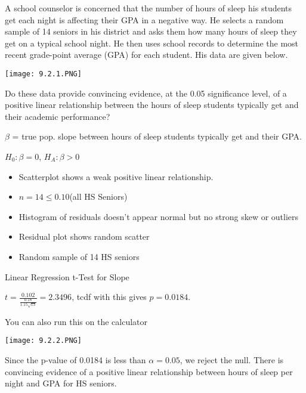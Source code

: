 \documentclass[../stats.tex]{subfiles}
\begin{document}
\begin{example}
    A school counselor is concerned that the number of hours of sleep his students get each night is affecting their GPA in a negative way. He selects a random sample of 14 seniors in his district and asks them how many hours of sleep they get on a typical school night. 
    He then uses school records to determine the most recent grade-point average (GPA) for each student. His data are given below.

    \begin{center}
        \texttt{[image: 9.2.1.PNG]}
    \end{center}

    Do these data provide convincing evidence, at the 0.05 significance level, of a positive linear relationship between the hours of sleep students typically get and their academic performance?

    $\beta$ = true pop. slope between hours of sleep students typically get and their GPA.

    $H_0: \beta = 0$, $H_A: \beta >0$

    \begin{itemize}
        \item Scatterplot shows a weak positive linear relationship.
        \item $n=14\leq 0.10$(all HS Seniors)
        \item Histogram of residuals doesn't appear normal but no strong skew or outliers 
        \item Residual plot shows random scatter 
        \item Random sample of 14 HS seniors
    \end{itemize}

    Linear Regression t-Test for Slope 

    $t=\frac{0.102}{\frac{0.18}{1.15\sqrt{13}}}=2.3496$, tcdf with this gives $p=0.0184$.

    You can also run this on the calculator 
    \begin{center}
        \texttt{[image: 9.2.2.PNG]}
    \end{center}

    Since the p-value of 0.0184 is less than $\alpha = 0.05$, we reject the null. There is convincing evidence of a positive linear relationship between hours of sleep per night and GPA for HS seniors.
\end{example}
\end{document}
